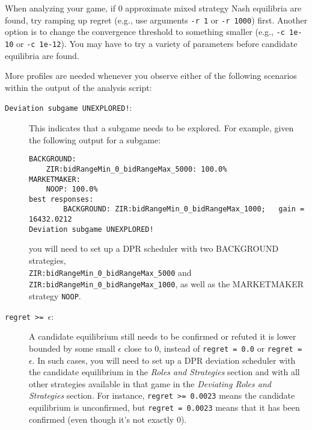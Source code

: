 \documentclass[11pt]{article}
\begin{document}
When analyzing your game, if 0 approximate mixed strategy Nash equilibria are found, try ramping up regret (e.g., use arguments \verb|-r 1| or \verb|-r 1000|) first.
Another option is to change the convergence threshold to something smaller (e.g., \verb|-c 1e-10| or \verb|-c 1e-12|). You may have to try a variety of parameters before candidate equilibria are found.

More profiles are needed whenever you observe either of the following scenarios within the output of the analysis script:
\begin{description}
\item[\texttt{Deviation subgame UNEXPLORED!}:] This indicates that a subgame needs to be explored.
For example, given the following output for a subgame:
\begin{verbatim}
BACKGROUND:
    ZIR:bidRangeMin_0_bidRangeMax_5000: 100.0%
MARKETMAKER:
    NOOP: 100.0%
best responses:
        BACKGROUND: ZIR:bidRangeMin_0_bidRangeMax_1000;   gain = 16432.0212
Deviation subgame UNEXPLORED!
\end{verbatim}
you will need to set up a DPR scheduler with two BACKGROUND strategies, \\
\verb|ZIR:bidRangeMin_0_bidRangeMax_5000| and \verb|ZIR:bidRangeMin_0_bidRangeMax_1000|, as well as the MARKETMAKER strategy \verb|NOOP|.

\item[\texttt{regret >= $\epsilon$}:] A candidate equilibrium still needs to be confirmed or refuted it is lower bounded by some small $\epsilon$ close to 0, instead of \verb|regret = 0.0| or \verb|regret = |$\epsilon$.  In such cases, you will need to set up a DPR deviation scheduler with the candidate equilibrium in the \emph{Roles and Strategies} section and with all other strategies available in that game in the \emph{Deviating Roles and Strategies} section.
For instance, \verb|regret >= 0.0023| means the candidate equilibrium is unconfirmed, but \verb|regret = 0.0023| means that it has been confirmed (even though it's not exactly 0).

\end{description}



\end{document}
